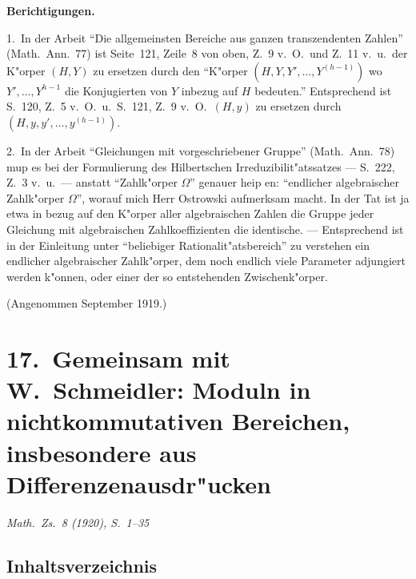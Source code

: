 \documentclass[12pt,a4paper]{article}
\begin{document}
\vspace{0.5cm}
\noindent\textbf{Berichtigungen.}

1.\ In der Arbeit ``Die allgemeinsten Bereiche aus ganzen transzendenten Zahlen'' (Math.\ Ann.\ 77) ist Seite~121, Zeile~8 von oben, Z.~9 v.\ O.\ und Z.~11 v.\ u.\ der K"orper $(H,Y)$ zu ersetzen durch den ``K"orper $(H, Y, Y', \ldots, Y^{(h-1)})$ wo $Y',\ldots,Y^{h-1}$ die Konjugierten von $Y$ inbezug auf $H$ bedeuten.'' Entsprechend ist S.~120, Z.~5 v.\ O.\ u.\ S.~121, Z.~9 v.\ O.\ $(H,y)$ zu ersetzen durch $(H, y, y', \ldots, y^{(h-1)})$.

2.\ In der Arbeit ``Gleichungen mit vorgeschriebener Gruppe'' (Math.\ Ann.\ 78) mup es bei der Formulierung des Hilbertschen Irreduzibilit"atssatzes --- S.~222, Z.~3 v.\ u.\ --- anstatt ``Zahlk"orper $\Omega$'' genauer heip en: ``endlicher algebraischer Zahlk"orper $\Omega$'', worauf mich Herr Ostrowski aufmerksam macht. In der Tat ist ja etwa in bezug auf den K"orper aller algebraischen Zahlen die Gruppe jeder Gleichung mit algebraischen Zahlkoeffizienten die identische. --- Entsprechend ist in der Einleitung unter ``beliebiger Rationalit"atsbereich'' zu verstehen ein endlicher algebraischer Zahlk"orper, dem noch endlich viele Parameter adjungiert werden k"onnen, oder einer der so entstehenden Zwischenk"orper.

\begin{flushright}
(Angenommen September 1919.)
\end{flushright}

\newpage

\section*{17.\ Gemeinsam mit W.\ Schmeidler: Moduln in nichtkommutativen Bereichen, insbesondere aus Differenzenausdr"ucken}
\begin{flushright}
\textit{Math.\ Zs.\ 8 (1920), S.~1--35}
\end{flushright}

\subsection*{Inhaltsverzeichnis}
\end{document}
